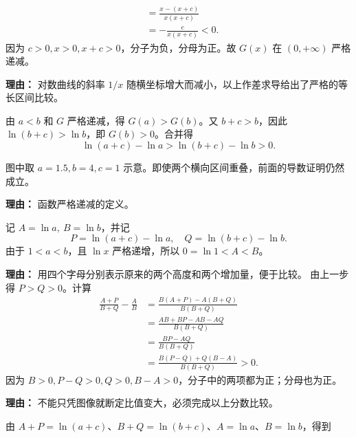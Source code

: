 \begin{proofbox}
\begin{description}[style=nextline, leftmargin=2.8em, labelsep=0.5em, itemsep=0.55em]
\begin{align*}
&=\frac{x-(x+c)}{x(x+c)}\\
&=-\frac c{x(x+c)}<0.
\end{align*}
因为 $c>0,x>0,x+c>0$，分子为负，分母为正。故 $G(x)$ 在 $(0,+\infty)$ 严格递减。\par\textbf{理由：} 对数曲线的斜率 $1/x$ 随横坐标增大而减小，以上作差求导给出了严格的等长区间比较。
\item[\textbf{步骤4（将几何规律应用到原题）：}] 由 $a<b$ 和 $G$ 严格递减，得 $G(a)>G(b)$。又 $b+c>b$，因此 $\ln(b+c)>\ln b$，即 $G(b)>0$。合并得
\[\ln(a+c)-\ln a>\ln(b+c)-\ln b>0.\]
\begin{center}
\end{center}图中取 $a=1.5,b=4,c=1$ 示意。即使两个横向区间重叠，前面的导数证明仍然成立。\par\textbf{理由：} 函数严格递减的定义。
\item[\textbf{步骤5（把高度关系转化为比值关系）：}] 记 $A=\ln a,\ B=\ln b$，并记
\[P=\ln(a+c)-\ln a,\quad Q=\ln(b+c)-\ln b.\]
由于 $1<a<b$，且 $\ln x$ 严格递增，所以 $0=\ln1<A<B$。
\par\textbf{理由：} 用四个字母分别表示原来的两个高度和两个增加量，便于比较。 由上一步得 $P>Q>0$。计算
\begin{align*}
\frac{A+P}{B+Q}-\frac AB
&=\frac{B(A+P)-A(B+Q)}{B(B+Q)}\\
&=\frac{AB+BP-AB-AQ}{B(B+Q)}\\
&=\frac{BP-AQ}{B(B+Q)}\\
&=\frac{B(P-Q)+Q(B-A)}{B(B+Q)}>0.
\end{align*}
因为 $B>0,P-Q>0,Q>0,B-A>0$，分子中的两项都为正；分母也为正。\par\textbf{理由：} 不能只凭图像就断定比值变大，必须完成以上分数比较。
\item[\textbf{步骤6（代回原式）：}] 由 $A+P=\ln(a+c)$、$B+Q=\ln(b+c)$、$A=\ln a$、$B=\ln b$，得到

\end{description}
\end{proofbox}
